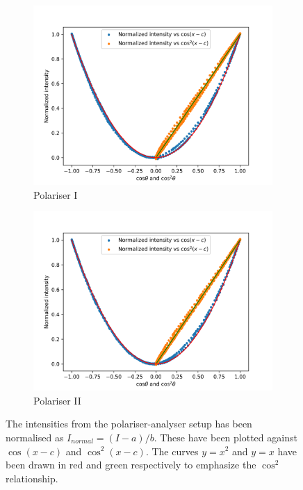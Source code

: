 \documentclass[11pt]{article}
\begin{document}
        \begin{figure}[H]
        \begin{subfigure}[b]{0.50\textwidth}
                \includegraphics[width=1.1\textwidth]{./pol_1_normal.png}
                \caption{Polariser I}
        \end{subfigure}
        \begin{subfigure}[b]{0.50\textwidth}
                \includegraphics[width=1.1\textwidth]{./pol_2_normal.png}
                \caption{Polariser II}
        \end{subfigure}
        \caption{The intensities from the polariser-analyser setup has been normalised as $I_{normal} = (I - a) / b$.
        These have been plotted against $\cos(x - c)$ and $\cos^2(x - c)$. The curves $y = x^2$ and $y = x$ have been drawn in red and green respectively
        to emphasize the $\cos^2$ relationship.}
        \label{fig:polarisers_normal}
        \end{figure}
        
\end{document}
